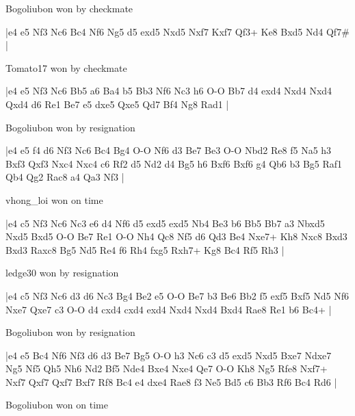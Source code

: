 \showboard

Bogoliubon won by checkmate

\makegametitle
|e4 e5 Nf3 Nc6 Bc4 Nf6 Ng5 d5 exd5 Nxd5 Nxf7 Kxf7 Qf3+ Ke8 Bxd5 Nd4 Qf7\#  |

\showboard

Tomato17 won by checkmate

\makegametitle
|e4 e5 Nf3 Nc6 Bb5 a6 Ba4 b5 Bb3 Nf6 Nc3 h6 O-O Bb7 d4 exd4 Nxd4 Nxd4 Qxd4 d6 Re1 Be7 e5 dxe5 Qxe5 Qd7 Bf4 Ng8 Rad1  |

\showboard

Bogoliubon won by resignation

\makegametitle
|e4 e5 f4 d6 Nf3 Nc6 Bc4 Bg4 O-O Nf6 d3 Be7 Be3 O-O Nbd2 Re8 f5 Na5 h3 Bxf3 Qxf3 Nxc4 Nxc4 c6 Rf2 d5 Nd2 d4 Bg5 h6 Bxf6 Bxf6 g4 Qb6 b3 Bg5 Raf1 Qb4 Qg2 Rac8 a4 Qa3 Nf3  |

\showboard

vhong\_loi won on time

\makegametitle
|e4 c5 Nf3 Nc6 Nc3 e6 d4 Nf6 d5 exd5 exd5 Nb4 Be3 b6 Bb5 Bb7 a3 Nbxd5 Nxd5 Bxd5 O-O Be7 Re1 O-O Nh4 Qc8 Nf5 d6 Qd3 Be4 Nxe7+ Kh8 Nxc8 Bxd3 Bxd3 Raxc8 Bg5 Nd5 Re4 f6 Rh4 fxg5 Rxh7+ Kg8 Bc4 Rf5 Rh3  |

\showboard

ledge30 won by resignation

\makegametitle
|e4 c5 Nf3 Nc6 d3 d6 Nc3 Bg4 Be2 e5 O-O Be7 b3 Be6 Bb2 f5 exf5 Bxf5 Nd5 Nf6 Nxe7 Qxe7 c3 O-O d4 cxd4 cxd4 exd4 Nxd4 Nxd4 Bxd4 Rae8 Re1 b6 Bc4+  |

\showboard

Bogoliubon won by resignation

\makegametitle
|e4 e5 Bc4 Nf6 Nf3 d6 d3 Be7 Bg5 O-O h3 Nc6 c3 d5 exd5 Nxd5 Bxe7 Ndxe7 Ng5 Nf5 Qh5 Nh6 Nd2 Bf5 Nde4 Bxe4 Nxe4 Qe7 O-O Kh8 Ng5 Rfe8 Nxf7+ Nxf7 Qxf7 Qxf7 Bxf7 Rf8 Bc4 e4 dxe4 Rae8 f3 Ne5 Bd5 c6 Bb3 Rf6 Bc4 Rd6  |

\showboard

Bogoliubon won on time

